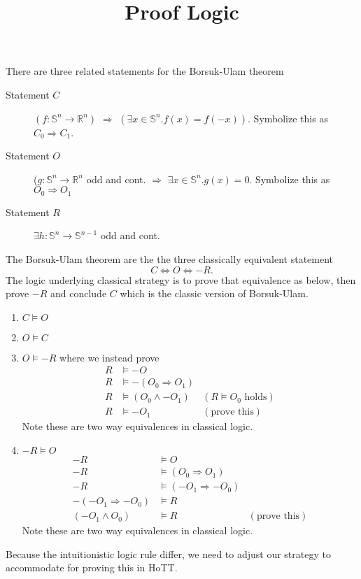 \documentclass[12pt]{amsart}
\newcommand{\RR}{\mathbb{R}}
\renewcommand{\SS}{\mathbb{S}}
\newcommand{\from}{\colon}
\newcommand{\imp}{\Rightarrow}
\newcommand{\isequiv}{\Leftrightarrow}
\theoremstyle{remark}
\theoremstyle{definition}
\begin{document}
	
\title{Proof Logic}
\maketitle

There are three related statements for the Borsuk-Ulam theorem

\begin{description}
\item[Statement $C$] $(f \from \SS^n \to \RR^n)$ $\imp$
  $(\exists x \in \SS^n. f(x) = f(-x))$. Symbolize this as $C_0
  \imp C_1$.
\item[Statement $O$] ($ g \from \SS^n \to \RR^n$ odd and
  cont. $\imp$ $\exists x \in \SS^n. g(x)=0$. Symbolize this as
  $O_0 \imp O_1$
\item[Statement $R$] $\exists h \from \SS^n \to \SS^{n-1}$ odd and
  cont. 
\end{description}

The Borsuk-Ulam theorem are the the three classically equivalent
statement \[C \isequiv O \isequiv - R.\] The logic underlying
classical strategy is to prove that equivalence as below, then prove
$-R$ and conclude $C$ which is the classic version of Borsuk-Ulam.

\begin{enumerate}
\item $C \models O$
\item $O \models C$
\item $O \models - R$ where we instead prove
  \begin{align*}
    R &\models -O &\\
    R &\models -(O_0 \imp O_1) &\\
    R &\models ( O_0 \wedge -O_1) &(R \models O_0 \text{ holds}) \\
    R &\models -O_1& (\text{prove this})
  \end{align*}
  Note these are two way equivalences in classical logic.
\item $-R \models O$
  \begin{align*}
    -R & \models O & \\
    -R & \models (O_0 \imp O_1) &\\
    -R & \models (-O_1 \imp -O_0) &\\
    -(-O_1 \imp -O_0) &\models R &\\
    (-O_1 \wedge O_0) &\models R & (\text{prove this})    
  \end{align*}
  Note these are two way equivalences in classical logic.
\end{enumerate}

Because the intuitionistic logic rule differ, we need to adjust our strategy to
accommodate for proving this in HoTT.



\end{document}

